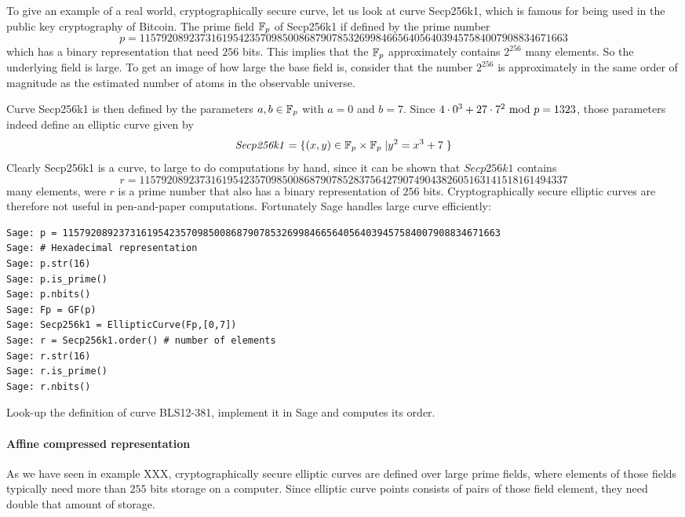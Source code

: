 \begin{example}To give an example of a real world, cryptographically secure curve, let us look at curve Secp256k1, which is famous for being used in the public key cryptography of Bitcoin. The prime field $\mathbb{F}_p$ of Secp256k1 if defined by the prime number
$$
p = \scriptstyle 115792089237316195423570985008687907853269984665640564039457584007908834671663
$$
which has a binary representation that need $256$ bits. This implies that the $\mathbb{F}_p$ approximately contains $2^{256}$ many elements. So the underlying field is large. To get an image of how large the base field is, consider that the number $2^{256}$ is approximately in the same order of magnitude as the estimated number of atoms in the observable universe. 

Curve Secp256k1 is then defined by the parameters $a,b\in \mathbb{F}_p$ with $a=0$ and $b=7$. Since $4\cdot 0^3 + 27\cdot 7^2 \text{ mod } p=1323$, those parameters indeed define an elliptic curve given by
$$
\mathit{Secp256k1} = \{(x,y)\in \mathbb{F}_p\times \mathbb{F}_p\;| y^2 = x^3 +7\;\} 
$$
Clearly Secp256k1 is a curve, to large to do computations by hand, since it can be shown that $\mathit{Secp256k1}$ contains 
$$
r = \scriptstyle 11579208923731619542357098500868790785283756427907490438260516
3141518161494337
$$
many elements, were $r$ is a prime number that also has a binary representation of $256$ bits. Cryptographically secure elliptic curves are therefore not useful in pen-and-paper computations. Fortunately Sage handles large curve efficiently:
\begin{verbatim}
Sage: p = 115792089237316195423570985008687907853269984665640564039457584007908834671663
Sage: # Hexadecimal representation
Sage: p.str(16)
Sage: p.is_prime()
Sage: p.nbits()
Sage: Fp = GF(p)
Sage: Secp256k1 = EllipticCurve(Fp,[0,7])
Sage: r = Secp256k1.order() # number of elements
Sage: r.str(16)
Sage: r.is_prime()
Sage: r.nbits()
\end{verbatim}
\end{example}
\begin{exercise}
Look-up the definition of curve BLS12-381, implement it in Sage and computes its order.
\end{exercise}
\paragraph{Affine compressed representation} As we have seen in example XXX, cryptographically secure elliptic curves are defined over large prime fields, where elements of those fields typically need more than $255$ bits storage on a computer. Since elliptic curve points consists of pairs of those field element, they need double that amount of storage.

